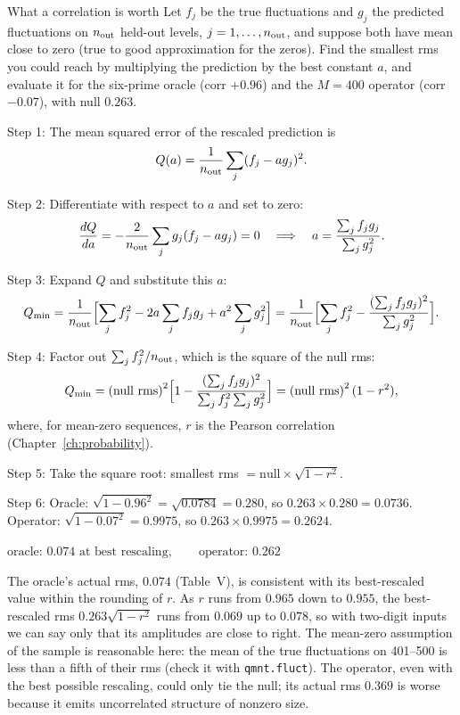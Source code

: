 \begin{sample}{What a correlation is worth}
Let $f_j$ be the true fluctuations and $g_j$ the predicted fluctuations on $n_{\rm out}$ held-out levels, $j=1,\dots,n_{\rm out}$, and suppose both have mean close to zero (true to good approximation for the zeros). Find the smallest rms you could reach by multiplying the prediction by the best constant $a$, and evaluate it for the six-prime oracle (corr $+0.96$) and the $M=400$ operator (corr $-0.07$), with null $0.263$.

Step 1: The mean squared error of the rescaled prediction is
\[
Q(a)=\frac{1}{n_{\rm out}}\sum_j (f_j-a g_j)^2 .
\]

Step 2: Differentiate with respect to $a$ and set to zero:
\[
\frac{dQ}{da}=-\frac{2}{n_{\rm out}}\sum_j g_j(f_j-a g_j)=0
\quad\Longrightarrow\quad a=\frac{\sum_j f_j g_j}{\sum_j g_j^2}.
\]

Step 3: Expand $Q$ and substitute this $a$:
\[
Q_{\min}=\frac{1}{n_{\rm out}}\Bigl[\sum_j f_j^2-2a\sum_j f_jg_j+a^2\sum_j g_j^2\Bigr]
=\frac{1}{n_{\rm out}}\Bigl[\sum_j f_j^2-\frac{(\sum_j f_jg_j)^2}{\sum_j g_j^2}\Bigr].
\]

Step 4: Factor out $\sum_j f_j^2/n_{\rm out}$, which is the square of the null rms:
\[
Q_{\min}=\text{(null rms)}^2\Bigl[1-\frac{(\sum_j f_jg_j)^2}{\sum_j f_j^2\sum_j g_j^2}\Bigr]
=\text{(null rms)}^2\,(1-r^2),
\]
where, for mean-zero sequences, $r$ is the Pearson correlation (Chapter~\ref{ch:probability}).

Step 5: Take the square root: smallest rms $=\text{null}\times\sqrt{1-r^2}$.

Step 6: Oracle: $\sqrt{1-0.96^2}=\sqrt{0.0784}=0.280$, so $0.263\times0.280=0.0736$. Operator: $\sqrt{1-0.07^2}=0.9975$, so $0.263\times0.9975=0.2624$.

$\boxed{\text{oracle: }0.074\text{ at best rescaling},\qquad\text{operator: }0.262}$

The oracle's actual rms, $0.074$ (Table~V), is consistent with its best-rescaled value within the rounding of $r$. As $r$ runs from $0.965$ down to $0.955$, the best-rescaled rms $0.263\sqrt{1-r^2}$ runs from $0.069$ up to $0.078$, so with two-digit inputs we can say only that its amplitudes are close to right. The mean-zero assumption of the sample is reasonable here: the mean of the true fluctuations on 401--500 is less than a fifth of their rms (check it with \texttt{qmnt.fluct}). The operator, even with the best possible rescaling, could only tie the null; its actual rms $0.369$ is worse because it emits uncorrelated structure of nonzero size.
\end{sample}

